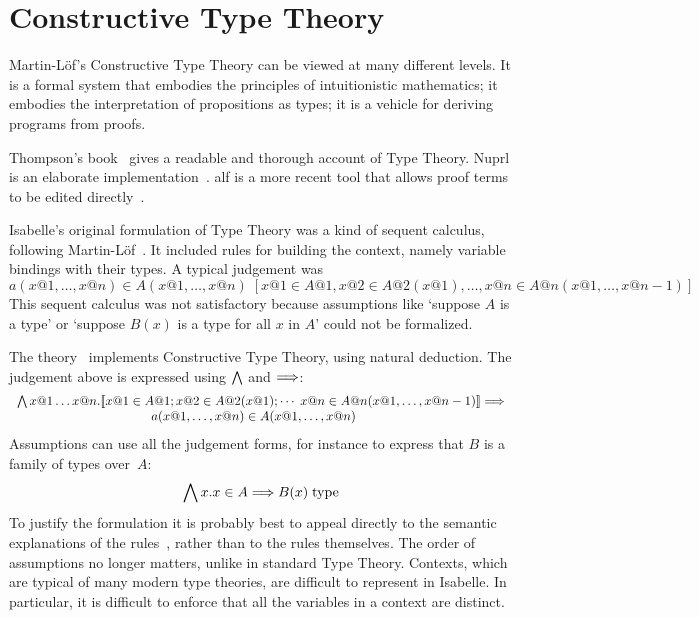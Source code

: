 \chapter{Constructive Type Theory}

Martin-L\"of's Constructive Type Theory \cite{martinlof84,nordstrom90} can
be viewed at many different levels.  It is a formal system that embodies
the principles of intuitionistic mathematics; it embodies the
interpretation of propositions as types; it is a vehicle for deriving
programs from proofs.  

Thompson's book~\cite{thompson91} gives a readable and thorough account of
Type Theory.  Nuprl is an elaborate implementation~\cite{constable86}.
{\sc alf} is a more recent tool that allows proof terms to be edited
directly~\cite{alf}.

Isabelle's original formulation of Type Theory was a kind of sequent
calculus, following Martin-L\"of~\cite{martinlof84}.  It included rules for
building the context, namely variable bindings with their types.  A typical
judgement was
\[   a(x@1,\ldots,x@n)\in A(x@1,\ldots,x@n) \; 
    [ x@1\in A@1, x@2\in A@2(x@1), \ldots, x@n\in A@n(x@1,\ldots,x@{n-1}) ]
\]
This sequent calculus was not satisfactory because assumptions like
`suppose $A$ is a type' or `suppose $B(x)$ is a type for all $x$ in $A$'
could not be formalized.  

The theory~ implements Constructive Type Theory, using
natural deduction.  The judgement above is expressed using $\bigwedge$ and
$\Longrightarrow$:
\[ \begin{array}{r@{}l}
     \Forall x@1\ldots x@n. &
          \List{x@1\in A@1; 
                x@2\in A@2(x@1); \cdots \; 
                x@n\in A@n(x@1,\ldots,x@{n-1})} \Imp \\
     &  \qquad\qquad a(x@1,\ldots,x@n)\in A(x@1,\ldots,x@n) 
    \end{array}
\]
Assumptions can use all the judgement forms, for instance to express that
$B$ is a family of types over~$A$:
\[ \bigwedge x . x\in A \Longrightarrow B(x)\;{\rm type} \]
To justify the {\CTT} formulation it is probably best to appeal directly
to the semantic explanations of the rules~\cite{martinlof84}, rather than
to the rules themselves.  The order of assumptions no longer matters,
unlike in standard Type Theory.  Contexts, which are typical of many modern
type theories, are difficult to represent in Isabelle.  In particular, it
is difficult to enforce that all the variables in a context are distinct.

